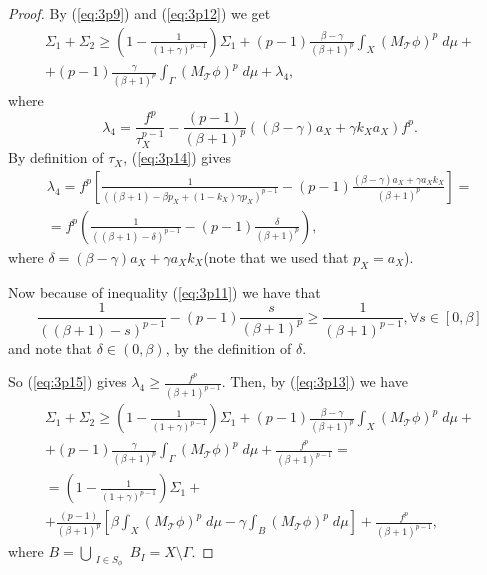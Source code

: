 \documentclass{article}
\numberwithin{equation}{section}
\theoremstyle{definition}
\theoremstyle{remark}
\newcommand{\mc}[1]{\mathcal{#1}}
\begin{document}
\begin{proof}
By (\ref{eq:3p9}) and (\ref{eq:3p12}) we get
\begin{multline} \label{eq:3p13}
\Sigma_1+\Sigma_2\geq \left(1-\frac{1}{(1+\gamma)^{p-1}} \right)\Sigma_1+ (p-1)\frac{\beta-\gamma}{(\beta +1)^p}\int_X \left(M_{\mc T}\phi \right)^p\; d\mu +\\
+ (p-1)\frac{\gamma}{(\beta +1)^p}\int_{\Gamma} \left(M_{\mc T}\phi \right)^p\; d\mu + \lambda_4,
\end{multline}
where
\begin{equation}\label{eq:3p14}
\lambda_4= \frac{f^p}{\tau_X^{p-1}}-\frac{(p-1)}{(\beta +1)^p}\left( (\beta - \gamma)a_X+\gamma k_X a_X \right)f^p.
\end{equation}
By definition of $\tau_X$, (\ref{eq:3p14}) gives
\begin{multline} \label{eq:3p15}
\lambda_4= f^p \left[\frac{1}{\left((\beta+1)-\beta p_X+ (1-k_X)\gamma p_X \right)^{p-1}}-(p-1)\frac{(\beta-\gamma)a_X+\gamma a_X k_X}{(\beta +1)^p} \right]=\\
=f^p \left( \frac{1}{\left( (\beta+1)-\delta \right)^{p-1}} -(p-1) \frac{\delta}{(\beta +1)^p}\right),
\end{multline}
where $\delta=(\beta-\gamma)a_X+\gamma a_X k_X$(note that we used that $p_X=a_X$).

Now because of inequality (\ref{eq:3p11}) we have that
\[
\frac{1}{\left( (\beta+1)-s \right)^{p-1}} -(p-1) \frac{s}{(\beta +1)^p}\geq \frac{1}{(\beta +1)^{p-1}}, \forall s\in[0,\beta]
\]
and note that $\delta\in (0,\beta)$, by the definition of $\delta$.

So (\ref{eq:3p15}) gives $\lambda_4 \geq \frac{f^p}{(\beta+1)^{p-1}}$. Then, by (\ref{eq:3p13}) we have
\begin{multline} \label{eq:3p16}
\Sigma_1+\Sigma_2 \geq \left( 1-\frac{1}{(1+\gamma)^{p-1}} \right)\Sigma_1+(p-1)\frac{\beta-\gamma}{(\beta+1)^p}\int_X \left( M_{\mc T}\phi \right)^p\;d\mu +\\
+ (p-1)\frac{\gamma}{(\beta+1)^p}\int_{\Gamma} \left( M_{\mc T}\phi \right)^p\;d\mu+\frac{f^p}{(\beta+1)^{p-1}}=\\
=\left( 1-\frac{1}{(1+\gamma)^{p-1}} \right)\Sigma_1+\\
+\frac{(p-1)}{(\beta+1)^p} \left[ \beta \int_X \left( M_{\mc T}\phi \right)^p\;d\mu -\gamma \int_B \left( M_{\mc T}\phi \right)^p\;d\mu \right] + \frac{f^p}{(\beta+1)^{p-1}},
\end{multline}
where $B=\bigcup_{\substack{I\in S_\phi}}B_I=X\setminus\Gamma$.


\end{proof}
\end{document}
